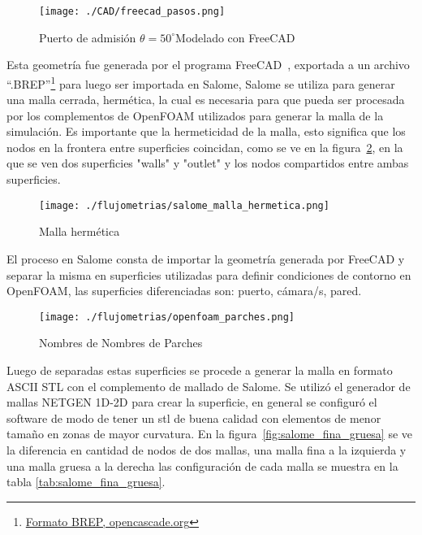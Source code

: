 \begin{figure}
    \centering
    \texttt{[image: ./CAD/freecad\_pasos.png]}
    \caption{Puerto de admisión $\theta=50^{\circ}$Modelado con
FreeCAD}\label{fig:admision_50}
\end{figure}

Esta geometría fue generada por el programa FreeCAD~\parencite{freecad},
exportada a un archivo
``.BREP''\footnote{\href{https://dev.opencascade.org/doc/overview/html/specification\_\_brep\_format.html}{Formato
BREP, opencascade.org}} para luego ser importada en Salome\parencite{salome},
%
Salome se utiliza para generar una malla cerrada, hermética, la cual es
necesaria para que pueda ser procesada por los complementos de OpenFOAM
utilizados para generar la malla de la simulación.
%
Es importante que la hermeticidad de la malla, esto significa que los nodos en
la frontera entre superficies coincidan, como se ve en la
figura~\ref{fig:salome_malla_hermetica}, en la que se ven dos superficies
"walls" y "outlet" y los nodos compartidos entre ambas superficies.
%
%
%

\begin{figure}
    \centering
    \texttt{[image: ./flujometrias/salome\_malla\_hermetica.png]}
    \caption{Malla hermética}\label{fig:salome_malla_hermetica}
\end{figure}

El proceso en Salome consta de importar la geometría generada por FreeCAD y
separar la misma en superficies utilizadas para definir condiciones de contorno
en OpenFOAM, las superficies diferenciadas son: puerto, cámara/s, pared.

\begin{figure}
    \centering
    \texttt{[image: ./flujometrias/openfoam\_parches.png]}
    \caption{Nombres de Nombres de Parches}\label{fig:openfoam_parches}
\end{figure}

Luego de separadas estas superficies se procede a generar la malla en formato
ASCII STL con el complemento de mallado de Salome.
%
Se utilizó el generador de mallas NETGEN 1D-2D para crear la superficie, en
general se configuró el software de modo de tener un stl de buena calidad con
elementos de menor tamaño en zonas de mayor curvatura.
%
En la figura~\ref{fig:salome_fina_gruesa} se ve la diferencia en cantidad de
nodos de dos mallas, una malla fina a la izquierda y una malla gruesa a la
derecha las configuración de cada malla se muestra en la tabla \ref{tab:salome_fina_gruesa}.
%

